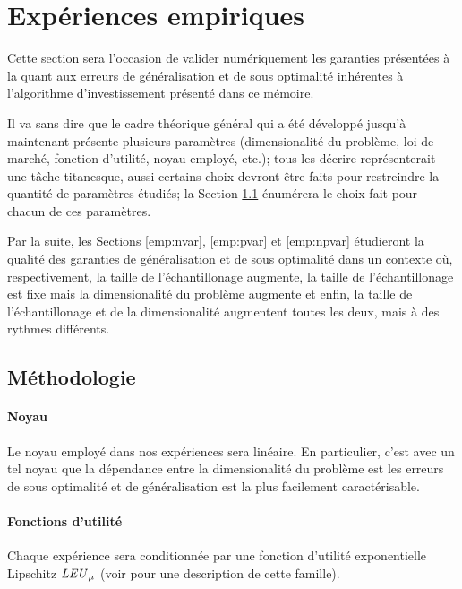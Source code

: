 \section{Expériences empiriques}

Cette section sera l'occasion de valider numériquement les garanties présentées à la \cit
quant aux erreurs de généralisation et de sous optimalité inhérentes à l'algorithme
d'investissement présenté dans ce mémoire.

Il va sans dire que le cadre théorique général qui a été développé jusqu'à maintenant
présente plusieurs paramètres (dimensionalité du problème, loi de marché, fonction
d'utilité, noyau employé, etc.); tous les décrire représenterait une tâche titanesque,
aussi certains choix devront être faits pour restreindre la quantité de paramètres
étudiés; la Section \ref{emp:metho} énumérera le choix fait pour chacun de ces paramètres.

Par la suite, les Sections \ref{emp:nvar}, \ref{emp:pvar} et \ref{emp:npvar} étudieront la
qualité des garanties de généralisation et de sous optimalité dans un contexte où,
respectivement, la taille de l'échantillonage augmente, la taille de l'échantillonage est
fixe mais la dimensionalité du problème augmente et enfin, la taille de l'échantillonage
et de la dimensionalité augmentent toutes les deux, mais à des rythmes différents. 


\subsection{Méthodologie}
\label{emp:metho}

\paragraph{Noyau}

Le noyau employé dans nos expériences sera linéaire. En particulier, c'est avec un tel
noyau que la dépendance entre la dimensionalité du problème est les erreurs de sous
optimalité et de généralisation est la plus facilement caractérisable.

\paragraph{Fonctions d'utilité}

Chaque expérience sera conditionnée par une fonction d'utilité exponentielle Lipschitz
$\mbox{\textit{LEU}}_\mu$ (voir  pour une description de cette famille).

